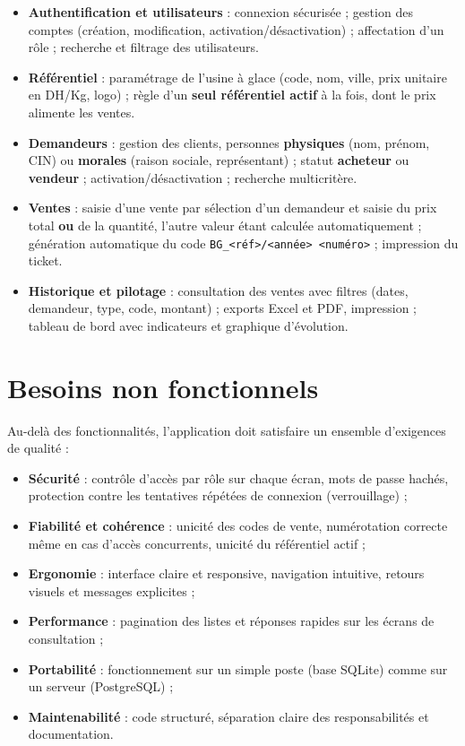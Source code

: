 \begin{itemize}
  \item \textbf{Authentification et utilisateurs} : connexion sécurisée ; gestion des comptes (création, modification, activation/désactivation) ; affectation d'un rôle ; recherche et filtrage des utilisateurs.
  \item \textbf{Référentiel} : paramétrage de l'usine à glace (code, nom, ville, prix unitaire en DH/Kg, logo) ; règle d'un \textbf{seul référentiel actif} à la fois, dont le prix alimente les ventes.
  \item \textbf{Demandeurs} : gestion des clients, personnes \textbf{physiques} (nom, prénom, CIN) ou \textbf{morales} (raison sociale, représentant) ; statut \textbf{acheteur} ou \textbf{vendeur} ; activation/désactivation ; recherche multicritère.
  \item \textbf{Ventes} : saisie d'une vente par sélection d'un demandeur et saisie du prix total \textbf{ou} de la quantité, l'autre valeur étant calculée automatiquement ; génération automatique du code \texttt{BG\_<réf>/<année> <numéro>} ; impression du ticket.
  \item \textbf{Historique et pilotage} : consultation des ventes avec filtres (dates, demandeur, type, code, montant) ; exports Excel et PDF, impression ; tableau de bord avec indicateurs et graphique d'évolution.
\end{itemize}

\section{Besoins non fonctionnels}

Au-delà des fonctionnalités, l'application doit satisfaire un ensemble d'exigences de qualité :

\begin{itemize}
  \item \textbf{Sécurité} : contrôle d'accès par rôle sur chaque écran, mots de passe hachés, protection contre les tentatives répétées de connexion (verrouillage) ;
  \item \textbf{Fiabilité et cohérence} : unicité des codes de vente, numérotation correcte même en cas d'accès concurrents, unicité du référentiel actif ;
  \item \textbf{Ergonomie} : interface claire et responsive, navigation intuitive, retours visuels et messages explicites ;
  \item \textbf{Performance} : pagination des listes et réponses rapides sur les écrans de consultation ;
  \item \textbf{Portabilité} : fonctionnement sur un simple poste (base SQLite) comme sur un serveur (PostgreSQL) ;
  \item \textbf{Maintenabilité} : code structuré, séparation claire des responsabilités et documentation.
\end{itemize}

